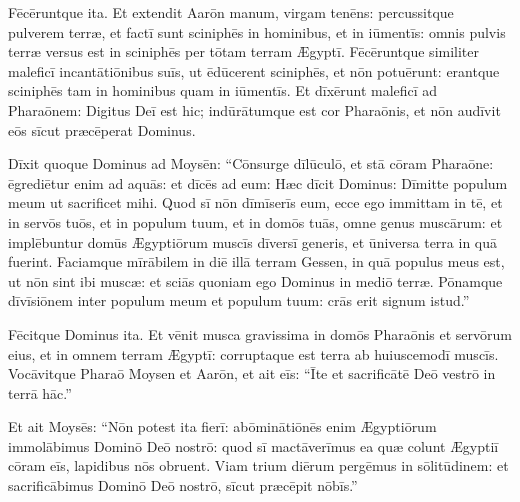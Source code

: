 Fēcēruntque ita. Et
extendit Aarōn manum, virgam tenēns: percussitque pulverem
terræ, et factī sunt sciniphēs in hominibus, et in
iūmentīs: omnis pulvis terræ versus est in
sciniphēs per tōtam terram Ægyptī.  Fēcēruntque
similiter maleficī
incantātiōnibus suīs, ut ēdūcerent
sciniphēs, et nōn potuērunt: erantque
sciniphēs tam in hominibus quam in
iūmentīs.  Et dīxērunt maleficī ad
Pharaōnem: Digitus Deī est hic; indūrātumque est cor Pharaōnis, et nōn audīvit eōs
sīcut præcēperat Dominus.  

Dīxit quoque
Dominus ad Moysēn: ``Cōnsurge
dīlūculō, et stā cōram Pharaōne:
ēgrediētur enim ad aquās: et dīcēs ad eum: Hæc dīcit Dominus: Dīmitte
populum meum ut sacrificet mihi.  Quod sī nōn dīmīserīs eum, ecce ego
immittam in tē, et in servōs tuōs,
et in populum tuum, et in domōs tuās, omne genus muscārum:
et implēbuntur domūs Ægyptiōrum muscīs
dīversī generis, et ūniversa terra in quā fuerint. 
Faciamque mīrābilem in diē illā terram Gessen, in quā populus meus est, ut
nōn sint ibi muscæ: et sciās quoniam ego Dominus in mediō
terræ.  Pōnamque dīvīsiōnem inter populum meum et populum
tuum: crās erit signum istud.''

Fēcitque Dominus ita. Et vēnit
musca gravissima in domōs Pharaōnis et
servōrum eius, et in omnem terram Ægyptī: corruptaque est
terra ab huiuscemodī muscīs.  Vocāvitque
Pharaō Moysen et Aarōn, et ait eīs: ``Īte et
sacrificātē Deō vestrō in terrā hāc.''  

Et ait Moysēs:
``Nōn potest ita fierī: abōminātiōnēs enim Ægyptiōrum
immolābimus Dominō Deō nostrō: quod sī
mactāverīmus ea quæ colunt Ægyptiī cōram eīs,
lapidibus nōs obruent.  Viam trium diērum
pergēmus in sōlitūdinem: et sacrificābimus Dominō Deō nostrō, sīcut
præcēpit nōbīs.''

